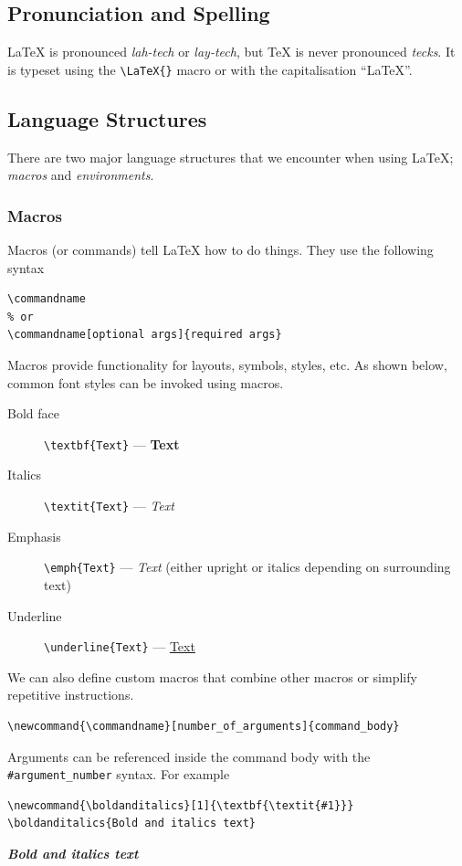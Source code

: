 \documentclass[11pt, twoside]{article}
\begin{document}
\subsection{Pronunciation and Spelling}
\LaTeX{} is pronounced \emph{lah-tech} or \emph{lay-tech}, but \TeX{} is never pronounced \emph{tecks}. It is typeset using the \lstinline|\LaTeX{}| macro or with the capitalisation ``LaTeX''.
\subsection{Language Structures}
There are two major language structures that we encounter when using \LaTeX{}; \textit{macros} and \textit{environments}.
\subsubsection{Macros}
Macros (or commands) tell \LaTeX{} how to do things. They use the following syntax
\begin{lstlisting}
\commandname
% or
\commandname[optional args]{required args}
\end{lstlisting}
Macros provide functionality for layouts, symbols, styles, etc. As shown below, common font styles can be invoked using macros.
\begin{description}
    \item[Bold face] \lstinline|\textbf{Text}| --- \textbf{Text}
    \item[Italics] \lstinline|\textit{Text}| --- \textit{Text}
    \item[Emphasis] \lstinline|\emph{Text}| --- \emph{Text} (either upright or italics depending on surrounding text)
    \item[Underline] \lstinline|\underline{Text}| --- \underline{Text}
\end{description}
We can also define custom macros that combine other macros or simplify repetitive instructions.
\begin{lstlisting}
\newcommand{\commandname}[number_of_arguments]{command_body}
\end{lstlisting}
Arguments can be referenced inside the command body with the \lstinline|#argument_number| syntax.
For example
\begin{lstlisting}
\newcommand{\boldanditalics}[1]{\textbf{\textit{#1}}}
\boldanditalics{Bold and italics text}
\end{lstlisting}
\newcommand{\boldanditalics}[1]{\textbf{\textit{#1}}}
\begin{outputbox}
    \boldanditalics{Bold and italics text}
\end{outputbox}
\end{document}
